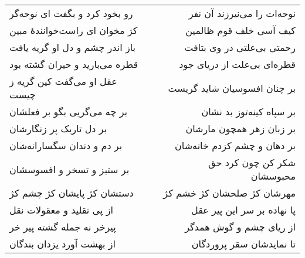 \begin{center}
\begin{longtable}{l p{0.5cm} r}
رو بخود کرد و بگفت ای نوحه‌گر
&&
نوحه‌ات را می‌نیرزند آن نفر
\\
کژ مخوان ای راست‌خوانندهٔ مبین
&&
کیف آسی خلف قوم ظالمین
\\
باز اندر چشم و دل او گریه یافت
&&
رحمتی بی‌علتی در وی بتافت
\\
قطره می‌بارید و حیران گشته بود
&&
قطره‌ای بی‌علت از دریای جود
\\
عقل او می‌گفت کین گریه ز چیست
&&
بر چنان افسوسیان شاید گریست
\\
بر چه می‌گریی بگو بر فعلشان
&&
بر سپاه کینه‌توز بد نشان
\\
بر دل تاریک پر زنگارشان
&&
بر زبان زهر همچون مارشان
\\
بر دم و دندان سگسارانه‌شان
&&
بر دهان و چشم کزدم خانه‌شان
\\
بر ستیز و تسخر و افسوسشان
&&
شکر کن چون کرد حق محبوسشان
\\
دستشان کژ پایشان کژ چشم کژ
&&
مهرشان کژ صلحشان کژ خشم کژ
\\
از پی تقلید و معقولات نقل
&&
پا نهاده بر سر این پیر عقل
\\
پیرخر نه جمله گشته پیر خر
&&
از ریای چشم و گوش همدگر
\\
از بهشت آورد یزدان بندگان
&&
تا نمایدشان سقر پروردگان
\\
\end{longtable}
\end{center}
